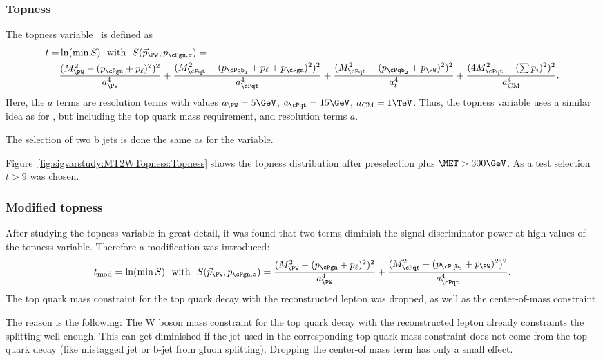 \subsubsection{Topness}
\label{sec:sigvarstudy:topness}

The topness variable~\cite{Graesser:2012qy} is defined as
\begin{align} t = &\ln(\min S)~\text{ with }~ S(\vec{p}_\PW, p_{\cPgn,z}) = \\
 &\frac{(M_\PW^2-(p_\cPgn+p_\ell)^2)^2}{a_\PW^4} + \frac{(M_\cPqt^2-(p_{\cPqb_1}+p_\ell+p_\cPgn)^2)^2}{a_\cPqt^4}
 + \frac{(M_\cPqt^2 - (p_{\cPqb_2}+p_\PW)^2)^2}{a_t^4} + \frac{(4M_\cPqt^2-(\sum p_i)^2)^2}{a_\mathrm{CM}^4}. \nonumber
 \end{align}
Here, the $a$ terms are resolution terms with values $a_\PW = 5\GeV$, $a_\cPqt = 15\GeV$, $a_\mathrm{CM} = 1\TeV$.
Thus, the topness variable uses a similar idea as for \MTtW, but including the top quark mass requirement, and resolution terms $a$.

The selection of two b jets is done the same as for the \MTtW variable.

Figure~\ref{fig:sigvarstudy:MT2WTopness:Topness} shows the topness distribution after preselection plus $\MET>300\GeV$. As a test selection $t>9$ was chosen.


\subsubsection{Modified topness}
\label{sec:sigvarstudy:modtopness}

After studying the topness variable in great detail, it was found that two terms diminish the signal discriminator power at high values of the topness variable. Therefore a modification was introduced:
\begin{equation}
t_\mathrm{mod} = \ln(\min S)~\text{ with }~ S(\vec{p}_\PW, p_{\cPgn,z}) = \frac{(M_\PW^2-(p_\cPgn+p_\ell)^2)^2}{a_\PW^4} + \frac{(M_\cPqt^2 - (p_{\cPqb_2}+p_\PW)^2)^2}{a_\cPqt^4}.
\end{equation}
The top quark mass constraint for the top quark decay with the reconstructed lepton was dropped, as well as the center-of-mass constraint.

The reason is the following: The W boson mass constraint for the top quark decay with the reconstructed lepton already constraints the \MET splitting well enough. This can get diminished if the jet used in the corresponding top quark mass constraint does not come from the top quark decay (like mistagged jet or b-jet from gluon splitting). Dropping the center-of mass term has only a small effect.

